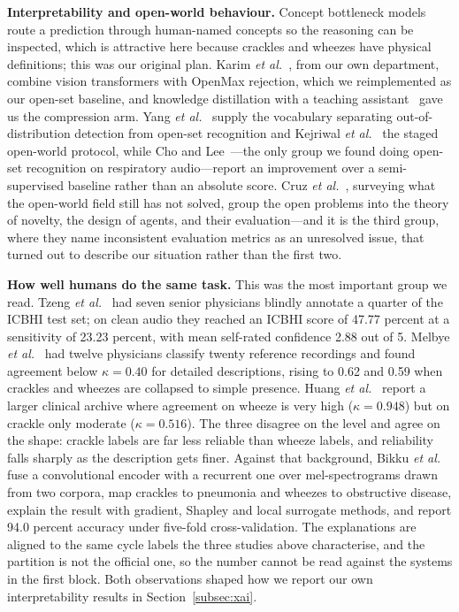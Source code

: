 \documentclass[journal,onecolumn]{IEEEtran}
\begin{document}
\textbf{Interpretability and open-world behaviour.} Concept bottleneck
models~\cite{koh2020cbm} route a prediction through human-named concepts so the reasoning
can be inspected, which is attractive here because crackles and wheezes have physical
definitions; this was our original plan. Karim \emph{et al.}~\cite{karim2024mosquito}, from
our own department, combine vision transformers with OpenMax rejection, which we
reimplemented as our open-set baseline, and knowledge distillation with a teaching
assistant~\cite{pavel2024kd} gave us the compression arm. Yang
\emph{et al.}~\cite{yang2024ood} supply the vocabulary separating out-of-distribution
detection from open-set recognition and Kejriwal \emph{et al.}~\cite{kejriwal2024owl} the
staged open-world protocol, while Cho and Lee~\cite{cho2025openset}---the only group we found
doing open-set recognition on respiratory audio---report an improvement over a semi-supervised
baseline rather than an absolute score. Cruz \emph{et al.}~\cite{cruz2025owl}, surveying what
the open-world field still has not solved, group the open problems into the theory of novelty,
the design of agents, and their evaluation---and it is the third group, where they name
inconsistent evaluation metrics as an unresolved issue, that turned out to describe our
situation rather than the first two.

\textbf{How well humans do the same task.} This was the most important group we read.
Tzeng \emph{et al.}~\cite{tzeng2025jmir} had seven senior physicians blindly annotate a
quarter of the ICBHI test set; on clean audio they reached an ICBHI score of 47.77 percent
at a sensitivity of 23.23 percent, with mean self-rated confidence 2.88 out of 5. Melbye
\emph{et al.}~\cite{melbye2016kappa} had twelve physicians classify twenty reference
recordings and found agreement below $\kappa = 0.40$ for detailed descriptions, rising to
0.62 and 0.59 when crackles and wheezes are collapsed to simple presence. Huang
\emph{et al.}~\cite{huang2024crackles} report a larger clinical archive where agreement on
wheeze is very high ($\kappa = 0.948$) but on crackle only moderate ($\kappa = 0.516$). The
three disagree on the level and agree on the shape: crackle labels are far less reliable than
wheeze labels, and reliability falls sharply as the description gets finer. Against that
background, Bikku \emph{et al.}~\cite{scirep2025cnnrnn} fuse a convolutional encoder with a
recurrent one over mel-spectrograms drawn from two corpora, map crackles to pneumonia and
wheezes to obstructive disease, explain the result with gradient, Shapley and local surrogate
methods, and report 94.0 percent accuracy under five-fold cross-validation. The explanations
are aligned to the same cycle labels the three studies above characterise, and the partition is
not the official one, so the number cannot be read against the systems in the first block. Both
observations shaped how we report our own interpretability results in
Section~\ref{subsec:xai}.
\end{document}
